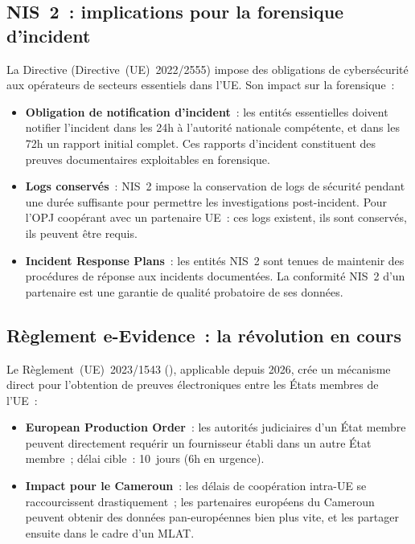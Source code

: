 \subsection{NIS~2~: implications pour la forensique d'incident}

La Directive  (Directive~(UE)~2022/2555)
impose des obligations de cybersécurité aux opérateurs de secteurs
essentiels dans l'UE. Son impact sur la forensique~:

\begin{itemize}
    \item \textbf{Obligation de notification d'incident}~: les entités
          essentielles doivent notifier l'incident dans les 24h à l'autorité
          nationale compétente, et dans les 72h un rapport initial complet.
          Ces rapports d'incident constituent des preuves documentaires
          exploitables en forensique.
    \item \textbf{Logs conservés}~: NIS~2 impose la conservation de logs
          de sécurité pendant une durée suffisante pour permettre les
          investigations post-incident. Pour l'OPJ coopérant avec un
          partenaire UE~: ces logs existent, ils sont conservés, ils peuvent
          être requis.
    \item \textbf{Incident Response Plans}~: les entités NIS~2 sont tenues
          de maintenir des procédures de réponse aux incidents documentées.
          La conformité NIS~2 d'un partenaire est une garantie de qualité
          probatoire de ses données.
\end{itemize}

\subsection{Règlement e-Evidence~: la révolution en cours}

Le Règlement~(UE)~2023/1543 (), applicable depuis
2026, crée un mécanisme direct pour l'obtention de preuves électroniques
entre les États membres de l'UE~:

\begin{itemize}
    \item \textbf{European Production Order}~: les autorités judiciaires
          d'un État membre peuvent directement requérir un fournisseur
          établi dans un autre État membre~; délai cible~: 10~jours
          (6h en urgence).
    \item \textbf{Impact pour le Cameroun}~: les délais de coopération
          intra-UE se raccourcissent drastiquement~; les partenaires
          européens du Cameroun peuvent obtenir des données pan-européennes
          bien plus vite, et les partager ensuite dans le cadre d'un MLAT.
\end{itemize}

